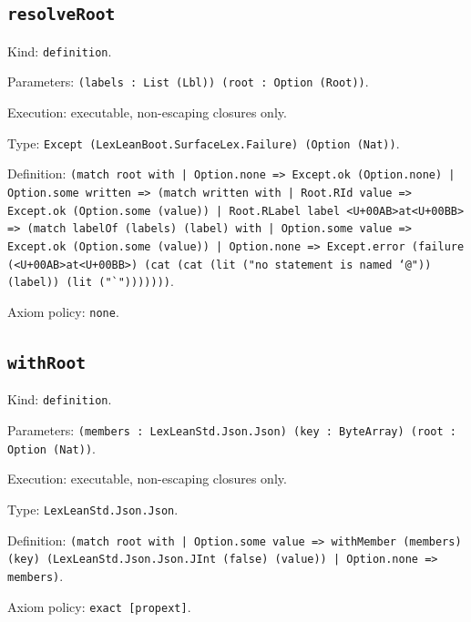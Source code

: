 \documentclass[11pt]{article}
\begin{document}
\subsection*{\texttt{resolveRoot}}
\noindent Kind: \texttt{definition}.\par
\noindent Parameters: \texttt{(labels : List (Lbl)) (root : Option (Root))}.\par
\noindent Execution: executable, non-escaping closures only.\par
\noindent Type: \texttt{Except (LexLeanBoot.SurfaceLex.Failure) (Option (Nat))}.\par
\noindent Definition: \texttt{(match root with | Option.none => Except.ok (Option.none) | Option.some written => (match written with | Root.RId value => Except.ok (Option.some (value)) | Root.RLabel label <U+00AB>at<U+00BB> => (match labelOf (labels) (label) with | Option.some value => Except.ok (Option.some (value)) | Option.none => Except.error (failure (<U+00AB>at<U+00BB>) (cat (cat (lit ("no statement is named `@")) (label)) (lit ("`")))))))}.\par
\noindent Axiom policy: \texttt{none}.\par
\subsection*{\texttt{withRoot}}
\noindent Kind: \texttt{definition}.\par
\noindent Parameters: \texttt{(members : LexLeanStd.Json.Json) (key : ByteArray) (root : Option (Nat))}.\par
\noindent Execution: executable, non-escaping closures only.\par
\noindent Type: \texttt{LexLeanStd.Json.Json}.\par
\noindent Definition: \texttt{(match root with | Option.some value => withMember (members) (key) (LexLeanStd.Json.Json.JInt (false) (value)) | Option.none => members)}.\par
\noindent Axiom policy: \texttt{exact [propext]}.\par
\end{document}
